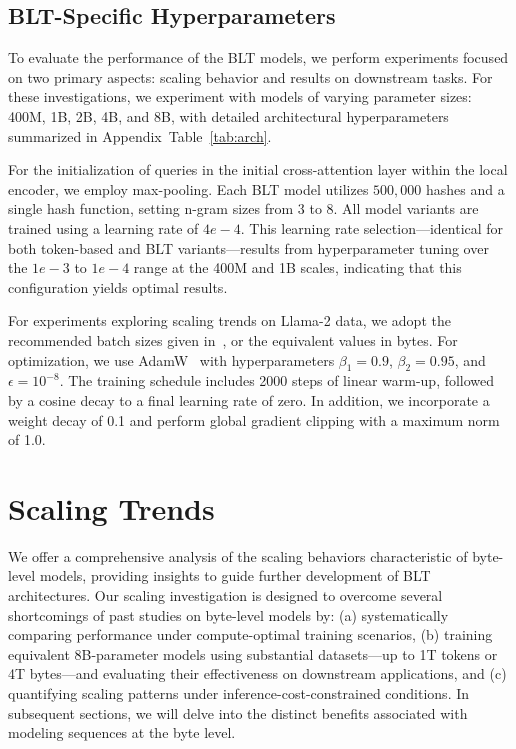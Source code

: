 \subsection{{\textsc BLT}-Specific Hyperparameters} 

To evaluate the performance of the {\textsc BLT} models, we perform experiments focused on two primary aspects: scaling behavior and results on downstream tasks. For these investigations, we experiment with models of varying parameter sizes: 400M, 1B, 2B, 4B, and 8B, with detailed architectural hyperparameters summarized in Appendix~Table~\ref{tab:arch}.

For the initialization of queries in the initial cross-attention layer within the local encoder, we employ max-pooling. Each {\textsc BLT} model utilizes $500{,}000$ hashes and a single hash function, setting n-gram sizes from 3 to 8. All model variants are trained using a learning rate of $4e-4$. This learning rate selection—identical for both token-based and {\textsc BLT} variants—results from hyperparameter tuning over the $1e-3$ to $1e-4$ range at the 400M and 1B scales, indicating that this configuration yields optimal results.

For experiments exploring scaling trends on Llama-2 data, we adopt the recommended batch sizes given in~\cite{dubey2024llama}, or the equivalent values in bytes. For optimization, we use AdamW~\citep{adamw} with hyperparameters $\beta_1 = 0.9$, $\beta_2 = 0.95$, and $\epsilon = 10^{-8}$. The training schedule includes 2000 steps of linear warm-up, followed by a cosine decay to a final learning rate of zero. In addition, we incorporate a weight decay of 0.1 and perform global gradient clipping with a maximum norm of 1.0.

\section{Scaling Trends}
\label{section:scaling}

We offer a comprehensive analysis of the scaling behaviors characteristic of byte-level models, providing insights to guide further development of {\textsc BLT} architectures. Our scaling investigation is designed to overcome several shortcomings of past studies on byte-level models by: (a) systematically comparing performance under compute-optimal training scenarios, (b) training equivalent 8B-parameter models using substantial datasets—up to 1T tokens or 4T bytes—and evaluating their effectiveness on downstream applications, and (c) quantifying scaling patterns under inference-cost-constrained conditions. In subsequent sections, we will delve into the distinct benefits associated with modeling sequences at the byte level.

